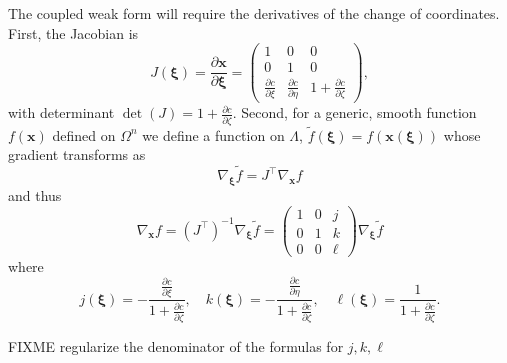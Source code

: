\documentclass[letterpaper,final,12pt,reqno]{amsart}
\newcommand{\grad}{\nabla}
\newcommand{\bx}{\mathbf{x}}
\newcommand{\bxi}{\bm{\xi}}
\begin{document}
The coupled weak form will require the derivatives of the change of coordinates.  First, the Jacobian is
\begin{equation}
J(\bxi) = \frac{\partial \bx}{\partial \bm{\xi}} = \begin{pmatrix} 1 & 0 & 0 \\  0 & 1 & 0 \\ \frac{\partial c}{\partial \xi} & \frac{\partial c}{\partial \eta} & 1+\frac{\partial c}{\partial \zeta} \end{pmatrix}, \label{jacchange}
\end{equation}
with determinant $\det(J)=1+\frac{\partial c}{\partial \zeta}$.  Second, for a generic, smooth function $f(\bx)$ defined on $\Omega^n$ we define a function on $\Lambda$, $\tilde f(\bxi) = f(\bx(\bxi))$ whose gradient transforms as
\begin{equation}
\grad_{\bxi} \tilde f = J^\top \grad_{\bx} f
\end{equation}
and thus
\begin{equation}
\grad_{\bx} f = (J^\top)^{-1} \grad_{\bxi} \tilde f = \begin{pmatrix} 1 & 0 & j \\ 0 & 1 & k \\ 0 & 0 & \ell \end{pmatrix} \grad_{\bxi} \tilde f \label{changederivatives}
\end{equation}
where
\begin{equation}
j(\bxi) = -\frac{\frac{\partial c}{\partial \xi}}{1+\frac{\partial c}{\partial \zeta}}, \quad k(\bxi) = -\frac{\frac{\partial c}{\partial \eta}}{1+\frac{\partial c}{\partial \zeta}}, \quad \ell(\bxi) = \frac{1}{1+\frac{\partial c}{\partial \zeta}}. \label{definejkl}
\end{equation}

FIXME regularize the denominator of the formulas for $j,k,\ell$
\end{document}

